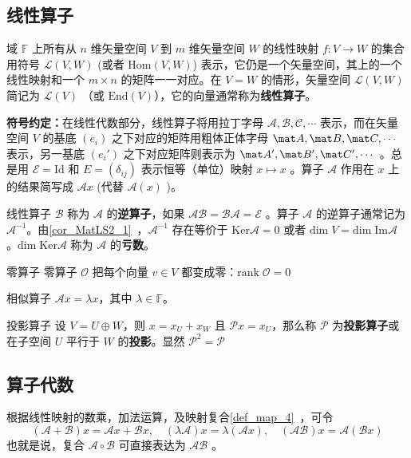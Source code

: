 
\subsection{线性算子}\label{sub_LiOper_4}
域 $\mathbb{F}$ 上所有从 $n$ 维矢量空间 $V$ 到 $m$ 维矢量空间 $W$ 的线性映射 $f:V\rightarrow W$ 的集合用符号 $\mathcal{L}(V,W)$ (或者 $\mathrm{Hom}(V,W)$) 表示，它仍是一个矢量空间，其上的一个线性映射和一个 $m\times n$ 的矩阵一一对应。在 $V=W$ 的情形，矢量空间 $\mathcal{L}(V,W)$ 简记为 $\mathcal{L}(V)$ （或 $\mathrm{End}(V)$），它的向量通常称为\textbf{线性算子}。

\textbf{符号约定：}在线性代数部分，线性算子将用拉丁字母 $\mathcal{A,B,C,\cdots}$ 表示，而在矢量空间 $V$ 的基底 $( e_i)$ 之下对应的矩阵用粗体正体字母 $\mat A,\mat B,\mat C,\cdots$ 表示，另一基底 $( e_i')$ 之下对应矩阵则表示为 $\mat A',\mat B',\mat C',\cdots$ 。总是用 $\mathcal{E}=\mathrm{Id}$ 和 $E=(\delta_{ij})$ 表示恒等（单位）映射 $ x\mapsto  x$ 。算子 $\mathcal{A}$ 作用在 $ x$ 上的结果简写成 $\mathcal{A} x$ (代替 $\mathcal{A}( x)$ )。

线性算子 $\mathcal{B}$ 称为 $\mathcal{A}$ 的\textbf{逆算子}，如果 $\mathcal{AB}=\mathcal{BA}=\mathcal{E}$ 。算子 $\mathcal{A}$ 的逆算子通常记为 $\mathcal{A}^{-1}$。由\autoref{cor_MatLS2_1}~，$\mathcal{A}^{-1}$ 存在等价于 $\mathrm{Ker}\mathcal{A}=0$ 或者 $\mathrm{dim}\;V=\mathrm{dim\;Im}\mathcal{A}$ 。$\mathrm{dim\;Ker}\mathcal{A}$ 称为 $\mathcal{A}$ 的\textbf{亏数}。
\begin{example}{零算子}\label{ex_LiOper_1}
零算子 $\mathcal{O}$ 把每个向量 $ v\in V$ 都变成零：$\mathrm{rank}\; \mathcal{O}=0$
\end{example}
\begin{example}{相似算子}
$\mathcal{A} x=\lambda x$，其中 $\lambda\in\mathbb{F}$。
\end{example}
\begin{example}{投影算子}
设 $V=U\oplus W$，则 $ x= x_U+ x_W$ 且 $\mathcal{P} x= x_U$，那么称 $\mathcal{P}$ 为\textbf{投影算子}或在子空间 $U$ 平行于 $W$ 的\textbf{投影}。显然 $\mathcal{P}^2=\mathcal{P}$
\end{example}
\subsection{算子代数}\label{sub_LiOper_3}
根据线性映射的数乘，加法运算，及映射复合\autoref{def_map_4}~，可令
\begin{equation}\label{eq_LiOper_1}
(\mathcal{A}+\mathcal{B}) x=\mathcal{A} x+\mathcal{B} x,\quad (\lambda\mathcal A) x=\lambda(\mathcal A x),\quad (\mathcal{AB}) x=\mathcal{A}(\mathcal{B} x)
\end{equation}
也就是说，复合 $\mathcal{A\circ B}$ 可直接表达为 $\mathcal{AB}$ 。

